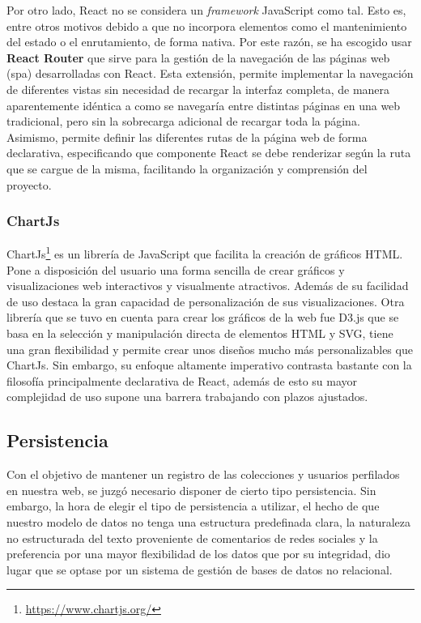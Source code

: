 Por otro lado, React no se considera un \textit{framework} JavaScript como tal. Esto es, entre otros motivos debido a que no incorpora elementos como el mantenimiento del estado o el enrutamiento, de forma nativa. Por este razón, se ha escogido usar \textbf{React Router} que sirve para la gestión de la navegación de las páginas web (\acrshort{spa}) desarrolladas con React. Esta extensión, permite implementar la navegación de diferentes vistas sin necesidad de recargar la interfaz completa, de manera aparentemente idéntica a como se navegaría entre distintas páginas en una web tradicional, pero sin la sobrecarga adicional de recargar toda la página. Asimismo, permite definir las diferentes rutas de la página web de forma declarativa, especificando que componente React se debe renderizar según la ruta que se cargue de la misma, facilitando la organización y comprensión del proyecto.

\subsubsection{ChartJs}

ChartJs\footnote{\url{https://www.chartjs.org/}} es un librería de JavaScript que facilita la creación de gráficos HTML. Pone a disposición del usuario una forma sencilla de crear gráficos y visualizaciones web interactivos y visualmente atractivos. Además de su facilidad de uso destaca la gran capacidad de personalización de sus visualizaciones.
Otra librería que se tuvo en cuenta para crear los gráficos de la web fue D3.js que se basa en la selección y manipulación directa de elementos HTML y SVG, tiene una gran flexibilidad y permite crear unos diseños mucho más personalizables que ChartJs. Sin embargo, su enfoque altamente imperativo contrasta bastante con la filosofía principalmente declarativa de React, además de esto su mayor complejidad de uso supone una barrera trabajando con plazos ajustados.
\subsection{Persistencia}
Con el objetivo de mantener un registro de las colecciones y usuarios perfilados en nuestra web, se juzgó necesario disponer de cierto tipo persistencia. Sin embargo, la hora de elegir el tipo de persistencia a utilizar, el hecho de que nuestro modelo de datos no tenga una estructura predefinada clara, la naturaleza no estructurada del texto proveniente de comentarios de redes sociales y la preferencia por una mayor flexibilidad de los datos que por su integridad, dio lugar que se optase por un sistema de gestión de bases de datos no relacional. 
